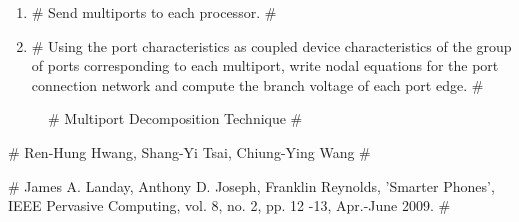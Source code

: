 \documentclass[12pt,a4]{article}
\begin{document}
\begin{enumerate}
\item #	Send multiports to each processor. # 
\item #	Using the port characteristics as coupled device characteristics of the group of ports corresponding to each multiport, write nodal equations for 
the port connection network and compute the branch voltage of each port edge. #
\end{enumerate}

\begin{figure}
\caption{# Multiport Decomposition Technique #}
\end{figure}


\begin{thebibliography}

# Ren-Hung Hwang, Shang-Yi Tsai, Chiung-Ying Wang #

# James A. Landay, Anthony D. Joseph, Franklin Reynolds, 'Smarter Phones', IEEE Pervasive Computing, vol. 8, no. 2, pp. 12 -13, Apr.-June 2009. #


\end{thebibliography}
\end{document}
